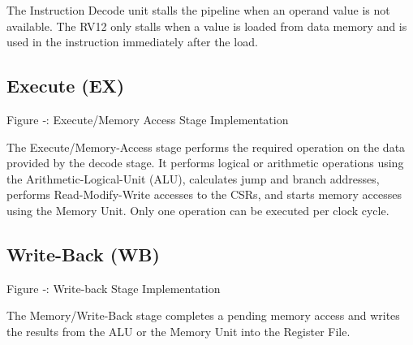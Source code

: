 The Instruction Decode unit stalls the pipeline when an operand value is
not available. The RV12 only stalls when a value is loaded from data
memory and is used in the instruction immediately after the load.

\subsection{Execute (EX)}\label{execute-ex-1}

\missingfigure{}

Figure ‑: Execute/Memory Access Stage Implementation

The Execute/Memory-Access stage performs the required operation on the
data provided by the decode stage. It performs logical or arithmetic
operations using the Arithmetic-Logical-Unit (ALU), calculates jump and
branch addresses, performs Read-Modify-Write accesses to the CSRs, and
starts memory accesses using the Memory Unit. Only one operation can be
executed per clock cycle.

\subsection{Write-Back (WB)}\label{write-back-wb-1}

\missingfigure{}

Figure ‑: Write-back Stage Implementation

The Memory/Write-Back stage completes a pending memory access and writes
the results from the ALU or the Memory Unit into the Register File.